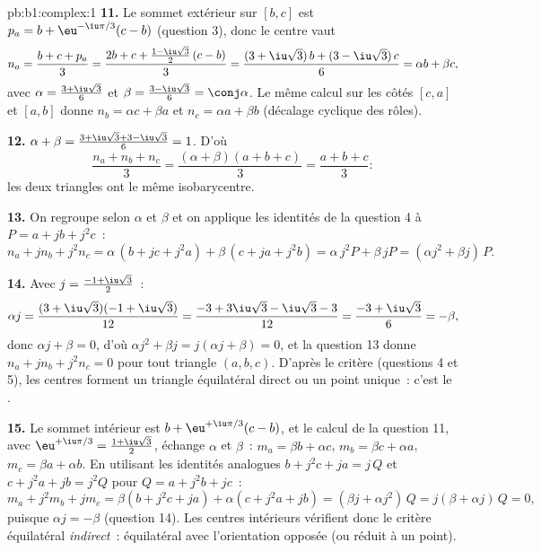 \begin{solution}{pb:b1:complex:1}
\textbf{11.} Le sommet extérieur sur $[b, c]$ est $p_a = b +
\eu^{-\iu\pi/3}(c - b)$ (question 3), donc le centre vaut
\[
n_a = \frac{b + c + p_a}3
= \frac{2b + c + \frac{1 - \iu\sqrt3}2\,(c - b)}3
= \frac{(3 + \iu\sqrt3)\,b + (3 - \iu\sqrt3)\,c}6
= \alpha b + \beta c ,
\]
avec $\alpha = \frac{3 + \iu\sqrt3}6$ et $\beta = \frac{3 -
\iu\sqrt3}6 = \conj\alpha$. Le même calcul sur les côtés $[c, a]$ et
$[a, b]$ donne $n_b = \alpha c + \beta a$ et $n_c = \alpha a + \beta
b$ (décalage cyclique des rôles).

\textbf{12.} $\alpha + \beta = \frac{3 + \iu\sqrt3 + 3 -
\iu\sqrt3}6 = 1$. D'où
\[
\frac{n_a + n_b + n_c}3
= \frac{(\alpha + \beta)(a + b + c)}3 = \frac{a + b + c}3 :
\]
les deux triangles ont le même isobarycentre.

\textbf{13.} On regroupe selon $\alpha$ et $\beta$ et on applique
les identités de la question 4 à $P = a + jb + j^2c$~:
\[
n_a + j n_b + j^2 n_c
= \alpha\,(b + jc + j^2 a) + \beta\,(c + ja + j^2 b)
= \alpha\,j^2 P + \beta\,j P
= (\alpha j^2 + \beta j)\,P .
\]

\textbf{14.} Avec $j = \frac{-1 + \iu\sqrt3}2$~:
\[
\alpha j = \frac{(3 + \iu\sqrt3)(-1 + \iu\sqrt3)}{12}
= \frac{-3 + 3\iu\sqrt3 - \iu\sqrt3 - 3}{12}
= \frac{-3 + \iu\sqrt3}6 = -\beta ,
\]
donc $\alpha j + \beta = 0$, d'où $\alpha j^2 + \beta j = j(\alpha j
+ \beta) = 0$, et la question 13 donne $n_a + jn_b + j^2n_c = 0$
pour tout triangle $(a, b, c)$. D'après le critère (questions 4
et 5), les centres forment un triangle équilatéral direct ou un
point unique~: c'est le .

\textbf{15.} Le sommet intérieur est $b + \eu^{+\iu\pi/3}(c - b)$,
et le calcul de la question 11, avec $\eu^{+\iu\pi/3} = \frac{1 +
\iu\sqrt3}2$, échange $\alpha$ et $\beta$~: $m_a = \beta b + \alpha
c$, $m_b = \beta c + \alpha a$, $m_c = \beta a + \alpha b$. En
utilisant les identités analogues $b + j^2c + ja = j\,Q$ et $c +
j^2a + jb = j^2 Q$ pour $Q = a + j^2b + jc$~:
\[
m_a + j^2 m_b + j m_c
= \beta(b + j^2 c + ja) + \alpha(c + j^2 a + jb)
= (\beta j + \alpha j^2)\, Q = j(\beta + \alpha j)\,Q = 0 ,
\]
puisque $\alpha j = -\beta$ (question 14). Les centres intérieurs
vérifient donc le critère équilatéral \emph{indirect}~: équilatéral
avec l'orientation opposée (ou réduit à un point).


\end{solution}
